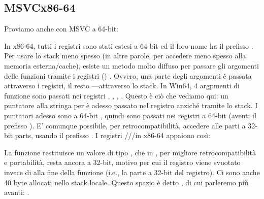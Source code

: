 \subsection{MSVC\EMDASH{}x86-64}

Proviamo anche con MSVC a 64-bit:




In x86-64, tutti i registri sono stati estesi a 64-bit ed il loro nome ha il prefisso .
Per usare lo stack meno spesso (in altre parole, per accedere meno spesso alla memoria esterna/cache), esiste un metodo molto diffuso per passare gli argomenti delle funzioni tramite i registri ()
\ifx\LITE\undefined {} \fi
.
Ovvero, una parte degli argomenti è passata attraverso i registri, il resto ---attraverso lo stack.
In Win64, 4 argpmenti di funzione sono passati nei registri \RCX, \RDX, , .
Questo è ciò che vediamo qui: un puntatore alla stringa per \printf è adesso passato nel registro \RCX anziché tramite lo stack.
I puntatori adesso sono a 64-bit , quindi sono passati nei registri a 64-bit (aventi il prefisso ).
E' comunque possibile, per retrocompatibilità, accedere alle parti a 32-bit parts, usando il prefisso .
I registri \RAX/\EAX/\AX/\AL in x86-64 appaiono così:


La funzione \main restituisce un valore di tipo \Tint{}, che in \CCpp, per migliore retrocompatibilità e portabilità, resta ancora a 32-bit, motivo per cui il registro \EAX viene svuotato invece di \RAX{} alla fine della funzione (i.e., la parte a 32-bit
del registro).
Ci sono anche 40 byte allocati nello stack locale.
Questo spazio è detto , di cui parleremo più avanti: .

